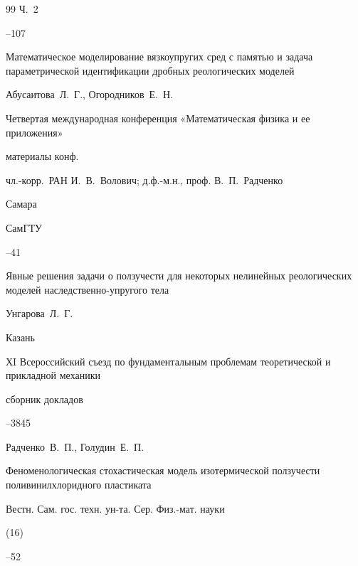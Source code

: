 \begin{thebibliography}{99}
\issueinfo Ч.~2

--107




\paper Математическое моделирование вязкоупругих сред с памятью и задача параметрической идентификации дробных реологических моделей

\by Абусаитова~Л.~Г., Огородников~Е.~Н.

\inbook Четвертая международная конференция «Математическая физика и ее приложения»

\bookinfo материалы конф. 

\eds чл.-корр.~РАН И.~В.~Волович; д.ф.-м.н., проф. В.~П.~Радченко

\publaddr Самара

\publ СамГТУ


--41




\paper Явные решения задачи о ползучести для некоторых нелинейных реологических моделей наследственно-упругого тела

\by Унгарова~Л.~Г.

\publaddr Казань

\inbook ХI Всероссийский съезд по фундаментальным проблемам теоретической и прикладной механики

\bookinfo сборник докладов


--3845





\by Радченко~В.~П., Голудин~Е.~П.

\paper Феноменологическая стохастическая модель изотермической ползучести поливинилхлоридного пластиката

\jour Вестн. Сам. гос. техн. ун-та. Сер. Физ.-мат. науки


(16)

--52









\end{thebibliography}



